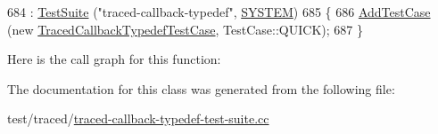 \begin{DoxyCode}
684   : \hyperlink{classns3_1_1TestSuite_a904b0c40583b744d30908aeb94636d1a}{TestSuite} (\textcolor{stringliteral}{"traced-callback-typedef"}, \hyperlink{classns3_1_1TestSuite_a1ebfcab34ec8161e085e8e3a1855eae0a90c5529a26ab3a5ffcc6e57040dbd82e}{SYSTEM})
685 \{
686   \hyperlink{classns3_1_1TestCase_a3718088e3eefd5d6454569d2e0ddd835}{AddTestCase} (\textcolor{keyword}{new} \hyperlink{classTracedCallbackTypedefTestCase}{TracedCallbackTypedefTestCase}, TestCase::QUICK);
687 \}
\end{DoxyCode}


Here is the call graph for this function\+:




The documentation for this class was generated from the following file\+:\begin{DoxyCompactItemize}
\item 
test/traced/\hyperlink{traced-callback-typedef-test-suite_8cc}{traced-\/callback-\/typedef-\/test-\/suite.\+cc}\end{DoxyCompactItemize}
